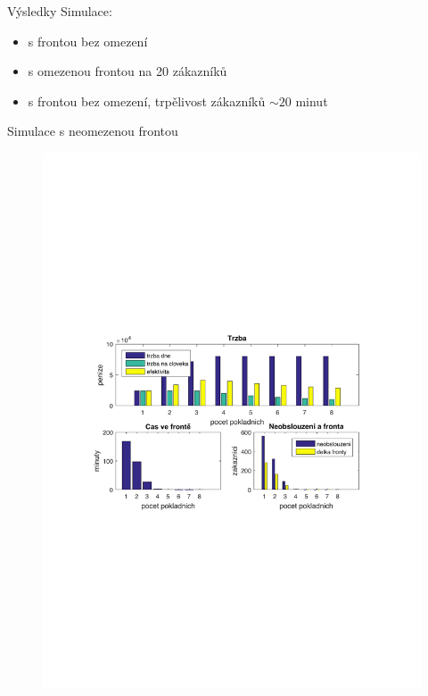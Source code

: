 \begin{frame}{Výsledky}
	Simulace:
	\begin{itemize}
    \item s frontou bez omezení
    \item s omezenou frontou na 20 zákazníků
    \item s frontou bez omezení, trpělivost zákazníků \(\sim 20\) minut
	\end{itemize}
\end{frame}

\begin{frame}{Simulace s neomezenou frontou}
	\begin{figure}
	\includegraphics[width=0.99\columnwidth]{imgs/bezOmezeni.pdf}
	\end{figure}
\end{frame}
